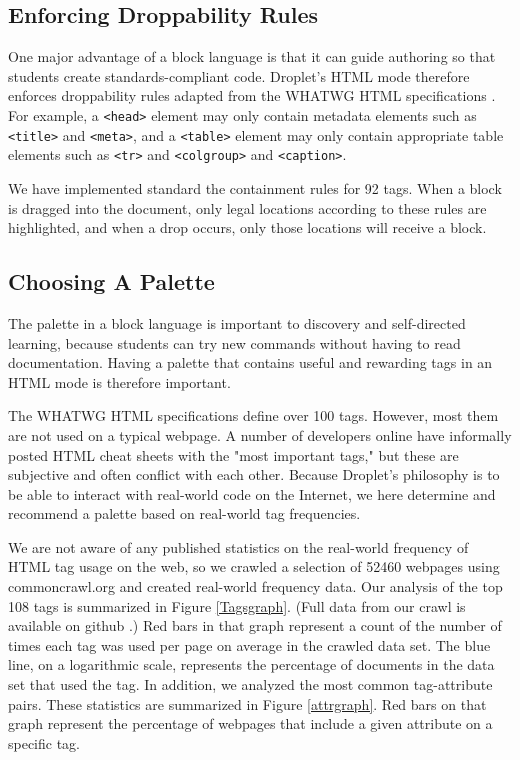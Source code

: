 \documentclass[conference]{IEEEtran}
\begin{document}
\subsection{Enforcing Droppability Rules}

One major advantage of a block language is that it can guide authoring so that students create standards-compliant code. Droplet's HTML mode therefore enforces droppability rules adapted from the WHATWG HTML specifications \cite{WHATWG}.  For example, a \texttt{<head>} element may only contain metadata elements such as \texttt{<title>} and \texttt{<meta>}, and a \texttt{<table>} element may only contain appropriate table elements such as \texttt{<tr>} and \texttt{<colgroup>} and \texttt{<caption>}.

We have implemented standard the containment rules for 92 tags.  When a block is dragged into the document, only legal locations according to these rules are highlighted, and when a drop occurs, only those locations will receive a block.

\subsection{Choosing A Palette}

The palette in a block language is important to discovery and self-directed learning, because students can try new commands without having to read documentation. Having a palette that contains useful and rewarding tags in an HTML mode is therefore important.

The WHATWG HTML specifications define over 100 tags. However, most them are not used on a typical webpage. A number of developers online have informally posted HTML cheat sheets with the "most important tags," \cite{Webmonkey} \cite{SimpleGuide} \cite{Usabilla} but these are subjective and often conflict with each other. Because Droplet's philosophy is to be able to interact with real-world code on the Internet, we here determine and recommend a palette based on real-world tag frequencies.

We are not aware of any published statistics on the real-world frequency of HTML tag usage on the web, so we crawled a selection of 52460 webpages using commoncrawl.org \cite{commoncrawl} and created real-world frequency data. Our analysis of the top 108 tags is summarized in Figure \ref{Tagsgraph}.  (Full data from our crawl is available on github \cite{FullResults}.)  Red bars in that graph represent a count of the number of times each tag was used per page on average in the crawled data set.  The blue line, on a logarithmic scale, represents the percentage of documents in the data set that used the tag.  In addition, we analyzed the most common tag-attribute pairs.  These statistics are summarized in Figure \ref{attrgraph}.  Red bars on that graph represent the percentage of webpages that include a given attribute on a specific tag.
\end{document}
